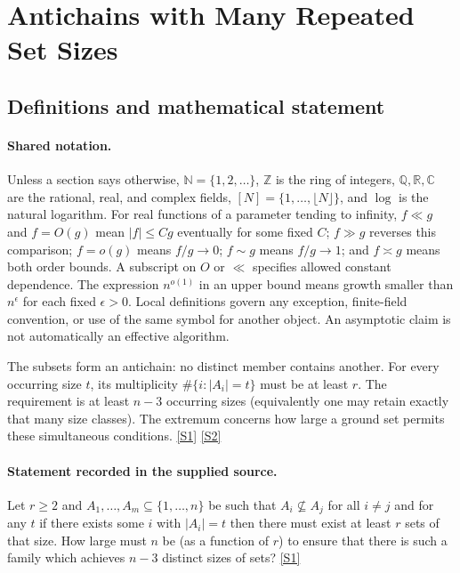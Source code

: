 \documentclass[11pt,a4paper]{article}
\newcommand{\N}{\mathbb{N}}
\newcommand{\Z}{\mathbb{Z}}
\newcommand{\Q}{\mathbb{Q}}
\newcommand{\R}{\mathbb{R}}
\newcommand{\C}{\mathbb{C}}
\newcommand{\sref}[2]{\hyperlink{source:#1:#2}{[S#2]}}
\begin{document}
\section{Antichains with Many Repeated Set Sizes}\label{statement}


\subsection{Definitions and mathematical statement}

\paragraph{Shared notation.}Unless a section says otherwise, $\N=\{1,2,\ldots\}$,
$\Z$ is the ring of integers, $\Q,\R,\C$ are the rational, real, and complex
fields, $[N]=\{1,\ldots,\lfloor N\rfloor\}$, and $\log$ is the natural
logarithm. For real functions of a parameter tending to infinity,
$f\ll g$ and $f=O(g)$ mean $|f|\leq Cg$ eventually for some fixed $C$;
$f\gg g$ reverses this comparison; $f=o(g)$ means $f/g\to0$;
$f\sim g$ means $f/g\to1$; and $f\asymp g$ means both order bounds.
A subscript on $O$ or $\ll$ specifies allowed constant dependence.
The expression $n^{o(1)}$ in an upper bound means growth smaller than
$n^\epsilon$ for each fixed $\epsilon>0$. Local definitions govern any
exception, finite-field convention, or use of the same symbol for another
object. An asymptotic claim is not automatically an effective algorithm.



The subsets form an antichain: no distinct member contains another. For every occurring size $t$, its multiplicity $\#\{i:|A_i|=t\}$ must be at least $r$. The requirement is at least $n-3$ occurring sizes (equivalently one may retain exactly that many size classes). The extremum concerns how large a ground set permits these simultaneous conditions. \sref{statement}{1} \sref{statement}{2}

\paragraph{Statement recorded in the supplied source.}
Let $r\geq 2$ and $A_1,\ldots,A_m\subseteq \{1,\ldots,n\}$ be such that $A_i\not\subseteq A_j$ for all $i\neq j$ and for any $t$ if there exists some $i$ with $\lvert A_i\rvert=t$ then there must exist at least $r$ sets of that size.
How large must $n$ be (as a function of $r$) to ensure that there is such a family which achieves $n-3$ distinct sizes of sets? \sref{statement}{1}
\end{document}
